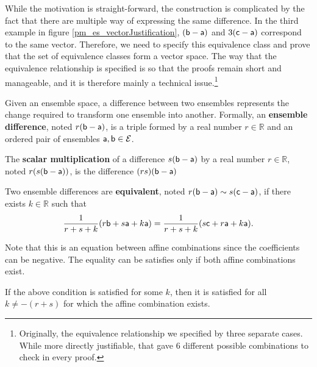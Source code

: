 While the motivation is straight-forward, the construction is complicated by the fact that there are multiple way of expressing the same difference. In the third example in figure \ref{pm_es_vectorJustification}, $(\ens[b] - \ens[a])$ and $3(\ens[c] - \ens[a])$ correspond to the same vector. Therefore, we need to specify this equivalence class and prove that the set of equivalence classes form a vector space. The way that the equivalence relationship is specified is so that the proofs remain short and manageable, and it is therefore mainly a technical issue.\footnote{Originally, the equivalence relationship we specified by three separate cases. While more directly justifiable, that gave 6 different possible combinations to check in every proof.}

\begin{mathSection}
	
	\begin{defn}
		Given an ensemble space, a difference between two ensembles represents the change required to transform one ensemble into another. Formally, an \textbf{ensemble difference}, noted $r(\ens[b] - \ens[a])$, is a triple formed by a real number $r \in \mathbb{R}$ and an ordered pair of ensembles $\ens[a],\ens[b] \in \Ens$.
	\end{defn}
	
	\begin{defn}
		The \textbf{scalar multiplication} of a difference $s(\ens[b] - \ens[a])$ by a real number $r \in \mathbb{R}$, noted $r(s(\ens[b] - \ens[a]))$, is the difference $(rs)(\ens[b] - \ens[a])$
	\end{defn}
	
	\begin{defn}
		Two ensemble differences are \textbf{equivalent}, noted $r(\ens[b] - \ens[a]) \sim s(\ens[c] - \ens[a])$, if there exists $k \in \mathbb{R}$ such that
		$$ \frac{1}{r+s+k} (r \ens[b] + s \ens[a] + k \ens[a]) = \frac{1}{r+s+k} (s \ens[c] + r \ens[a] + k \ens[a]).$$
	\end{defn}
	
	\begin{remark}
		Note that this is an equation between affine combinations since the coefficients can be negative. The equality can be satisfies only if both affine combinations exist.
	\end{remark}
	
	\begin{coro}
		If the above condition is satisfied for some $k$, then it is satisfied for all $k \neq -(r+s)$ for which the affine combination exists.
	\end{coro}
	

\end{mathSection}
